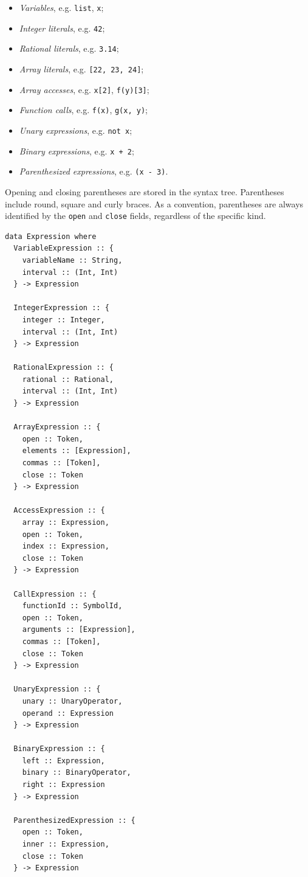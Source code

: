 \documentclass[11pt, american, draft]{PhdThesis}
\begin{document}
  \begin{itemize}[noitemsep,topsep=0pt]
    \item \emph{Variables}, e.g. \verb$list$, \verb$x$;
    \item \emph{Integer literals}, e.g. \verb$42$;
    \item \emph{Rational literals}, e.g. \verb$3.14$;
    \item \emph{Array literals}, e.g. \verb$[22, 23, 24]$;
    \item \emph{Array accesses}, e.g. \verb$x[2]$, \verb$f(y)[3]$;
    \item \emph{Function calls}, e.g. \verb$f(x)$, \verb$g(x, y)$;
    \item \emph{Unary expressions}, e.g. \verb$not x$;
    \item \emph{Binary expressions}, e.g. \verb$x + 2$;
    \item \emph{Parenthesized expressions}, e.g. \verb$(x - 3)$.
  \end{itemize}

  Opening and closing parentheses are stored in the syntax tree. Parentheses include round, square
  and curly braces. As a convention, parentheses are always identified by the \verb$open$ and
  \verb$close$ fields, regardless of the specific kind.

\begin{verbatim}
data Expression where
  VariableExpression :: {
    variableName :: String,
    interval :: (Int, Int)
  } -> Expression

  IntegerExpression :: {
    integer :: Integer,
    interval :: (Int, Int)
  } -> Expression

  RationalExpression :: {
    rational :: Rational,
    interval :: (Int, Int)
  } -> Expression

  ArrayExpression :: {
    open :: Token,
    elements :: [Expression],
    commas :: [Token],
    close :: Token
  } -> Expression

  AccessExpression :: {
    array :: Expression,
    open :: Token,
    index :: Expression,
    close :: Token
  } -> Expression

  CallExpression :: {
    functionId :: SymbolId,
    open :: Token,
    arguments :: [Expression],
    commas :: [Token],
    close :: Token
  } -> Expression

  UnaryExpression :: {
    unary :: UnaryOperator,
    operand :: Expression
  } -> Expression

  BinaryExpression :: {
    left :: Expression,
    binary :: BinaryOperator,
    right :: Expression
  } -> Expression

  ParenthesizedExpression :: {
    open :: Token,
    inner :: Expression,
    close :: Token
  } -> Expression
\end{verbatim}
\end{document}
